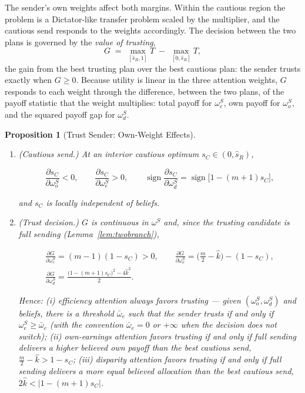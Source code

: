 \documentclass[11pt]{article}
\theoremstyle{plain}
\newtheorem{proposition}{Proposition}
\theoremstyle{remark}
\newcommand{\sgn}{\operatorname{sign}}
\begin{document}
The sender's own weights affect both margins.  Within the cautious region the problem is a Dictator-like transfer problem scaled by the multiplier, and the cautious send responds to the weights accordingly.  The decision between the two plans is governed by the \emph{value of trusting},
\[
        G \;=\; \max_{[\hat s_R,1]}T \;-\; \max_{[0,\hat s_R]}T ,
\]
the gain from the best trusting plan over the best cautious plan: the sender trusts exactly when $G\ge0$.  Because utility is linear in the three attention weights, $G$ responds to each weight through the difference, between the two plans, of the payoff statistic that the weight multiplies: total payoff for $\omega_e^S$, own payoff for $\omega_o^S$, and the squared payoff gap for $\omega_d^S$.

\begin{proposition}[Trust Sender: Own-Weight Effects]
\label{prop:trust_ownweights}
\mbox{}
\begin{enumerate}[topsep=2pt,itemsep=2pt]
\item \emph{(Cautious send.)}  At an interior cautious optimum $s_C\in(0,\hat s_R)$,
\begin{csbox}
\[
        \frac{\partial s_C}{\partial \omega_o^S}<0,
        \qquad
        \frac{\partial s_C}{\partial \omega_e^S}>0,
        \qquad
        \sgn\frac{\partial s_C}{\partial \omega_d^S}
        =
        \sgn\big[1-(m+1)s_C\big],
\]
\end{csbox}
and $s_C$ is locally independent of beliefs.
\item \emph{(Trust decision.)}  $G$ is continuous in $\omega^S$ and, since the trusting candidate is full sending (Lemma~\ref{lem:twobranch}),
\begin{csbox}
\begin{gather*}
        \frac{\partial G}{\partial\omega_e^S}
        =(m-1)(1-s_C)>0,
        \qquad
        \frac{\partial G}{\partial\omega_o^S}
        =\Big(\frac m2-\hat k\Big)-(1-s_C),
        \\
        \frac{\partial G}{\partial\omega_d^S}
        =\frac{\big(1-(m+1)s_C\big)^2-4\hat k^2}{2}.
\end{gather*}
\end{csbox}
Hence: (i) efficiency attention \emph{always} favors trusting --- given $(\omega_o^S,\omega_d^S)$ and beliefs, there is a threshold $\bar\omega_e$ such that the sender trusts if and only if $\omega_e^S\ge\bar\omega_e$ (with the convention $\bar\omega_e=0$ or $+\infty$ when the decision does not switch); (ii) own-earnings attention favors trusting if and only if full sending delivers a higher believed own payoff than the best cautious send, $\tfrac m2-\hat k>1-s_C$; (iii) disparity attention favors trusting if and only if full sending delivers a more equal believed allocation than the best cautious send, $2\hat k<\big|1-(m+1)s_C\big|$.
\end{enumerate}
\end{proposition}
\end{document}
